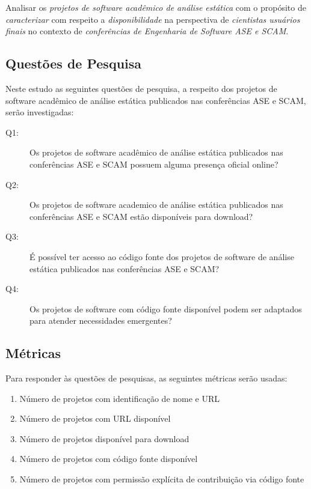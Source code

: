 Analisar os \textit{projetos de software acadêmico de análise estática}
com o propósito de \textit{caracterizar}
com respeito a \textit{disponibilidade}
na perspectiva de \textit{cientistas usuários finais}
no contexto de \textit{conferências de Engenharia de Software ASE e SCAM}.

\subsection{Questões de Pesquisa}

Neste estudo as seguintes questões de pesquisa, a respeito dos projetos de
software acadêmico de análise estática publicados nas conferências ASE e SCAM,
serão investigadas:

\newcommand{\EstudoUmQuestaoUm}{
  Os projetos de software acadêmico de análise estática publicados nas conferências ASE e SCAM possuem alguma presença oficial online?
}
\newcommand{\EstudoUmQuestaoDois}{
  Os projetos de software academico de análise estática publicados nas conferências ASE e SCAM estão disponíveis para download?
}
\newcommand{\EstudoUmQuestaoTres}{
  É possível ter acesso ao código fonte dos projetos de software de análise estática publicados nas conferências ASE e SCAM?
}
\newcommand{\EstudoUmQuestaoQuatro}{
  Os projetos de software com código fonte disponível podem ser adaptados para atender necessidades emergentes?
}

\begin{description}
  \item [Q1:] \EstudoUmQuestaoUm
  \item [Q2:] \EstudoUmQuestaoDois
  \item [Q3:] \EstudoUmQuestaoTres
  \item [Q4:] \EstudoUmQuestaoQuatro
\end{description}

\subsection{Métricas}

Para responder às questões de pesquisas, as seguintes métricas serão usadas:

\begin{enumerate}
  \item Número de projetos com identificação de nome e URL
  \item Número de projetos com URL disponível
  \item Número de projetos disponível para download
  \item Número de projetos com código fonte disponível
  \item Número de projetos com permissão explícita de contribuição via código fonte
\end{enumerate}

